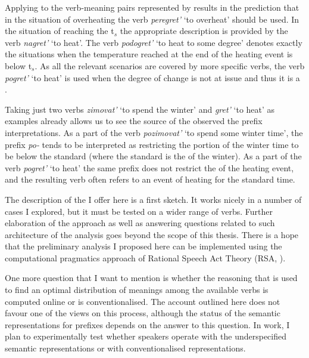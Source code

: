 Applying  to the verb-meaning pairs represented by  results in the prediction that in the situation of overheating the verb \textit{peregret'} `to overheat' should be used. In the situation of reaching the t$_s$ the appropriate description is provided by the verb \textit{nagret'} `to heat'. The verb \textit{podogret'} `to heat to some degree' denotes exactly the situations when the temperature reached at the end of the heating event is below t$_s$. As all the relevant scenarios are covered by more specific verbs, the verb \textit{pogret'} `to heat' is used when the degree of change is not at issue and thus it is a .

Taking just two verbs \textit{zimovat'} `to spend the winter' and \textit{gret'} `to heat' as examples already allows us to see the source of the observed  the prefix interpretations. As a part of the verb \textit{pozimovat'} `to spend some winter time', the prefix \textit{po-} tends to be interpreted as restricting the portion of the winter time to be below the standard (where the standard is the  of the winter). As a part of the verb \textit{pogret'} `to heat' the same prefix does not restrict the  of the heating event, and the resulting verb often refers to an event of heating for the standard time. 

The description of the  I offer here is a first sketch. It works nicely in a number of cases I explored, but it must be tested on a wider range of verbs. Further elaboration of the approach as well as answering questions related to such architecture of the analysis goes beyond the scope of this thesis. There is a hope that the preliminary analysis I proposed here can be implemented using the computational pragmatics approach of Rational Speech Act Theory (RSA, \citealt{Franke:09, FrankGoodman:12, GoodmanStuhlmuller:13, FrankeJager:15, GoodmanFrank:16}). 

One more question that I want to mention is whether the reasoning that is used to find an optimal distribution of meanings among the available verbs is computed online or is conventionalised. The account outlined here does not favour one of the views on this process, although the status of the semantic representations for prefixes depends on the answer to this question. In  work, I plan to experimentally test whether speakers operate with the underspecified semantic representations or with conventionalised representations. 

